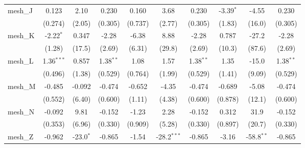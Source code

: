 \begin{tabular}{lccccccccc}
   mesh\_J                                                     & 0.123          & 2.10           & 0.230          & 0.160          & 3.68          & 0.230          & -3.39$^{*}$    & -4.55          & 0.230\\   
                                                               & (0.274)        & (2.05)         & (0.305)        & (0.737)        & (2.77)        & (0.305)        & (1.83)         & (16.0)         & (0.305)\\   
   mesh\_K                                                     & -2.22$^{*}$    & 0.347          & -2.28          & -6.38          & 8.88          & -2.28          & 0.787          & -27.2          & -2.28\\   
                                                               & (1.28)         & (17.5)         & (2.69)         & (6.31)         & (29.8)        & (2.69)         & (10.3)         & (87.6)         & (2.69)\\   
   mesh\_L                                                     & 1.36$^{***}$   & 0.857          & 1.38$^{**}$    & 1.08           & 1.57          & 1.38$^{**}$    & 1.35           & -15.0          & 1.38$^{**}$\\   
                                                               & (0.496)        & (1.38)         & (0.529)        & (0.764)        & (1.99)        & (0.529)        & (1.41)         & (9.09)         & (0.529)\\   
   mesh\_M                                                     & -0.485         & -0.092         & -0.474         & -0.652         & -4.35         & -0.474         & -0.689         & -5.08          & -0.474\\   
                                                               & (0.552)        & (6.40)         & (0.600)        & (1.11)         & (4.38)        & (0.600)        & (0.878)        & (12.1)         & (0.600)\\   
   mesh\_N                                                     & -0.092         & 9.81           & -0.152         & -1.23          & 2.28          & -0.152         & 0.312          & 31.9           & -0.152\\   
                                                               & (0.353)        & (6.96)         & (0.330)        & (0.909)        & (5.28)        & (0.330)        & (0.897)        & (20.7)         & (0.330)\\   
   mesh\_Z                                                     & -0.962         & -23.0$^{*}$    & -0.865         & -1.54          & -28.2$^{***}$ & -0.865         & -3.16          & -58.8$^{**}$   & -0.865\\   

\end{tabular}
